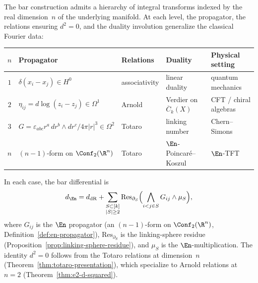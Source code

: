 \begin{proposition}
\label{prop:en-fourier-hierarchy}
The bar construction admits a hierarchy of integral transforms
indexed by the real dimension~$n$ of the underlying manifold.
At each level, the propagator, the relations ensuring $d^2 = 0$,
and the duality involution generalize the classical Fourier data:

\medskip
\begin{center}
\small
\renewcommand{\arraystretch}{1.3}
\begin{tabular}{@{}cllll@{}}
\hline
$n$ & Propagator & Relations & Duality & Physical setting \\
\hline
$1$ & $\delta(x_i - x_j) \in H^0$
 & associativity & linear duality
 & quantum mechanics \\[2pt]
$2$ & $\eta_{ij} = d\log(z_i - z_j) \in \Omega^1$
 & Arnold & Verdier on $\overline{C}_k(X)$
 & CFT / chiral algebras \\[2pt]
$3$ & $G = \varepsilon_{abc} r^a\, dr^b \wedge dr^c / 4\pi|r|^3
 \in \Omega^2$
 & Totaro & linking number
 & Chern--Simons \\[2pt]
$n$ & $(n{-}1)$-form on $\Conf_2(\R^n)$
 & Totaro & $\En$-Poincar\'e--Koszul
 & $\En$-TFT \\
\hline
\end{tabular}
\end{center}
\medskip

\noindent
In each case, the bar differential is
\[
d_{\En}
= d_{\mathrm{dR}}
+ \sum_{\substack{S \subset [k] \\ |S| \geq 2}}
\mathrm{Res}_{\partial_S}
\Bigl(\bigwedge_{i < j \in S} G_{ij} \wedge \mu_S\Bigr),
\]
where $G_{ij}$ is the $\En$ propagator
\textup{(}an $(n{-}1)$-form on $\Conf_2(\R^n)$,
Definition~\textup{\ref{def:en-propagator})},
$\mathrm{Res}_{\partial_S}$ is the linking-sphere residue
\textup{(}Proposition~\textup{\ref{prop:linking-sphere-residue})},
and $\mu_S$ is the $\En$-multiplication. The identity $d^2 = 0$
follows from the Totaro relations at dimension~$n$
\textup{(}Theorem~\textup{\ref{thm:totaro-presentation})},
which specialize to Arnold relations at $n = 2$
\textup{(}Theorem~\textup{\ref{thm:e2-d-squared})}.
\end{proposition}

